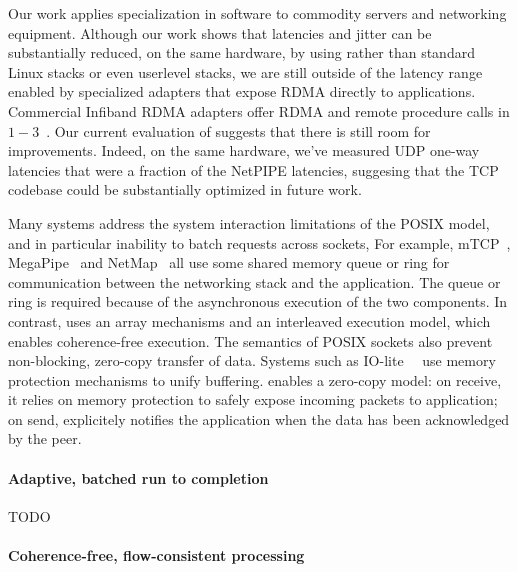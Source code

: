 Our work applies
specialization in software to commodity servers and networking
equipment.  Although our work shows that latencies and jitter can be
substantially reduced, on the same hardware, by using \ix rather than
standard Linux stacks or even userlevel stacks, we are still outside
of the latency range enabled by specialized adapters that expose RDMA
directly to applications.  Commercial Infiband RDMA adapters offer
RDMA and remote procedure calls in
$1-3$\microsecond~\cite{DBLP:conf/sosp/OngaroRSOR11,Jose:2011:MDH,mitchell:rdma,dragojevic14farm}.
Our current evaluation of \ix suggests that there is still room for
improvements.  Indeed, on the same hardware, we've measured UDP
one-way latencies that were a fraction of the NetPIPE latencies,
suggesing that the TCP codebase could be substantially optimized in
future work.

Many systems address the system interaction limitations of the POSIX
model, and in particular inability to batch requests across sockets,
For example, mTCP~\cite{jeong2014mtcp},
MegaPipe~\cite{han2012megapipe} and NetMap~\cite{rizzo2012netmap} all
use some shared memory queue or ring for communication between the
networking stack and the application.  The queue or ring is required
because of the asynchronous execution of the two components.  In
contrast, \ix uses an array mechanisms and an interleaved execution
model, which enables coherence-free execution.  The semantics of POSIX
sockets also prevent non-blocking, zero-copy transfer of data. Systems
such as IO-lite~~\cite{DBLP:journals/tocs/PaiDZ00} use memory
protection mechanisms to unify buffering.  \ix enables a zero-copy
model: on receive, it relies on memory protection to safely expose
incoming packets to application; on send, \ix explicitely notifies the
application when the data has been acknowledged by the peer.



\paragraph{Adaptive, batched run to completion}

\todo TODO

\paragraph{Coherence-free, flow-consistent processing}

